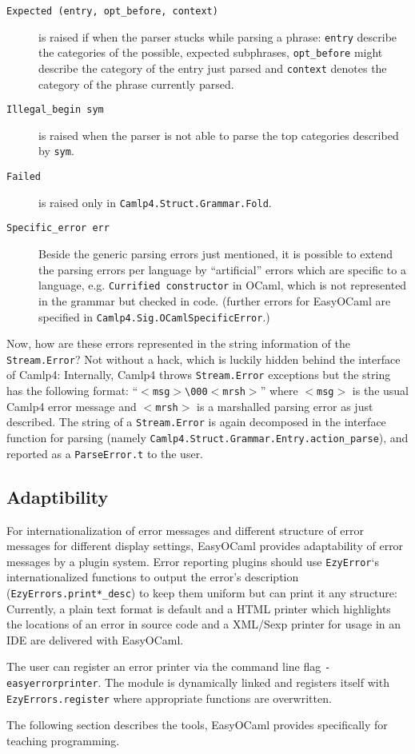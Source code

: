 \begin{description}
    \item[\texttt{Expected~(entry,~opt\_before,~context)}] is raised 
        if when the parser stucks while parsing a phrase: \texttt{entry} 
        describe the categories of the possible, expected subphrases, 
        \texttt{opt\_before} might describe the category of the entry 
        just parsed and \texttt{context} denotes the category of the 
        phrase currently parsed.
    \item[\texttt{Illegal\_begin~sym}] is raised when the parser is 
        not able to parse the top categories described by \texttt{sym}.
    \item[\texttt{Failed}] is raised only in 
        \texttt{Camlp4.Struct.Grammar.Fold}.
    \item[\texttt{Specific\_error~err}] Beside the generic parsing 
        errors just mentioned, it is possible to extend the parsing 
        errors per language by ``artificial'' errors which are specific 
        to a language, e.g. \texttt{Currified~constructor} in OCaml, 
        which is not represented in the grammar but checked in code. 
        (further errors for EasyOCaml are specified in 
        \texttt{Camlp4.Sig.OCamlSpecificError}.)
\end{description}

Now, how are these errors represented in the string information of the 
\texttt{Stream.Error}?  Not without a hack, which is luckily hidden 
behind the interface of Camlp4:  Internally, Camlp4 throws 
\texttt{Stream.Error} exceptions but the string has the following 
format: ``\texttt{$<$msg$>$\textbackslash{}000$<$mrsh$>$}'' where 
\texttt{$<$msg$>$} is the usual Camlp4 error message and 
\texttt{$<$mrsh$>$} is a marshalled parsing error as just described. The 
string of a \texttt{Stream.Error} is again decomposed in the interface 
function for parsing (namely 
\texttt{Camlp4.Struct.Grammar.Entry.action\_parse}), and reported as a 
\texttt{ParseError.t} to the user.


\subsection{Adaptibility}
\label{hd003002}
For internationalization of error messages and different structure of 
error messages for different display settings, EasyOCaml provides 
adaptability of error messages by a plugin system.  Error reporting 
plugins should use \texttt{EzyError}`s internationalized functions to 
output the error's description (\texttt{EzyErrors.print*\_desc}) to keep 
them uniform but can print it any structure:  Currently, a plain text 
format is default and a HTML printer which highlights the locations of 
an error in source code and a XML/Sexp printer for usage in an IDE are 
delivered with EasyOCaml.

The user can register an error printer via the command line flag 
\texttt{-easyerrorprinter}.  The module is dynamically linked and 
registers itself with \texttt{EzyErrors.register} where appropriate 
functions are overwritten.

The following section describes the tools, EasyOCaml provides 
specifically for teaching programming.
